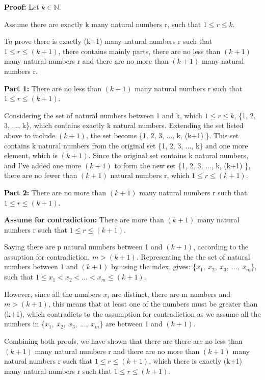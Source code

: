 \documentclass[12pt]{article}
\begin{document}
\textbf{Proof:} Let $k \in \mathbb{N}.$

\noindent Assume there are exactly k many natural numbers r, such that $1 \leq r \leq k$.

\noindent To prove there is exactly (k+1) many natural numbers r such that $1 \leq r \leq (k+1)$, there contains mainly parts, there are no less than $(k+1)$ many natural numbers r and there are no more than $(k+1)$ many natural numbers r.

\noindent \textbf{Part 1:} There are no less than $(k+1)$ many natural numbers r such that $1 \leq r \leq (k+1)$.

\noindent Considering the set of natural numbers between 1 and k, which $1 \leq r \leq k$, \{1, 2, 3, ..., k\}, which contains exactly k natural numbers.
Extending the set listed above to include $(k+1)$, the set becoms \{1, 2, 3, ..., k, (k+1) \}. This set contains k natural numbers from the original set \{1, 2, 3, ..., k\} and one more element, which is $(k+1)$.
Since the original set contains k natural numbers, and I've added one more $(k+1)$ to form the new set \{1, 2, 3, ..., k, (k+1) \}, there are no fewer than $(k+1)$ natural numbers r, which $1 \leq r \leq (k+1)$.

\noindent \textbf{Part 2:} There are no more than $(k+1)$ many natural numbers r such that $1 \leq r \leq (k+1)$.

\noindent \textbf{Assume for contradiction:} There are more than $(k+1)$ many natural numbers r such that $1 \leq r \leq (k+1)$.

\noindent Saying there are p natural numbers between 1 and $(k+1)$, according to the assuption for contradiction, $m > (k+1)$. 
Representing the the set of natural numbers between 1 and $(k+1)$ by using the index, gives: \{$x_1,\ x_2,\ x_3,\ ...,\ x_m$\}, such that $1 \leq x_1 < x_2 < ... < x_m \leq (k+1)$.

\noindent However, since all the numbers $x_i$ are distinct, there are m numbers and $m > (k+1)$, this means that at least one of the numbers must be greater than (k+1), which contradicts to the assumption for contradiction as we assume all the numbers in \{$x_1,\ x_2,\ x_3,\ ...,\ x_m$\} are between 1 and $(k+1)$.

\noindent Combining both proofs, we have shown that there are there are no less than $(k+1)$ many natural numbers r and there are no more than $(k+1)$ many natural numbers r such that $1 \leq r \leq (k+1)$, which there is exactly (k+1) many natural numbers r such that $1 \leq r \leq (k+1)$.
\end{document}
